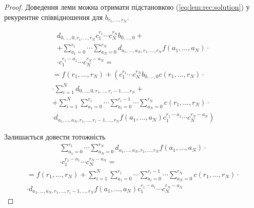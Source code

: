 \documentclass{KnuBulletin}
\begin{document}
\begin{multicols}{2}
\begin{proof}
    Доведення леми можна отримати підстановкою (\ref{eq:lem:rec:solution})  у рекурентне співвідношення для $b_{r_1,\dots,r_N}$.
        
        \begin{multline*}
        d_{0,\dots,0,r_1,\dots,r_N}
        c_1^{r_1}\cdots
        c_N^{r_N}
        b_{0,\dots,0}
        +\\+
        \sum_{a_1=0}^{r_1}
        \cdots
        \sum_{a_N=0}^{r_N}
        d_{a_1,\dots,a_N,r_1,\dots,r_N}
        f(a_1,\dots,a_N)
        \cdot\\\cdot
        c_1^{r_1-a_1}
        \cdots
        c_N^{r_N-a_N}
        =
        \end{multline*}
        \begin{multline*}
        =
        f(r_1,\dots,r_N) + 
        \left(
        c_1^{r_1}
        \cdots
        c_N^{r_N}
        b_{0,\dots,0}
        c(r_1,\dots,r_N) 
        \cdot\right.\\\left.\cdot
        \sum_{i=1}^{N}
        d_{0,\dots,0,r_1,\dots,r_i-1,\dots,r_N}
        +        
        \right.\\\left.
        +
        \sum_{i=1}^{N}
        \sum_{a_1=0}^{r_1}
        \cdots
        \sum_{a_i=0}^{r_i-1}
        \cdots
        \sum_{a_N=0}^{r_N}
        c(r_1,\dots,r_N) 
        \cdot\right.\\\left.\cdot
        d_{a_1,\dots,a_N,r_1,\dots,r_i-1,\dots,r_N}
        f(a_1,\dots,a_N)
        c_1^{r_1-a_1}
        \cdots
        c_N^{r_N-a_N}
        \right)
        \end{multline*}        
        
        Залишається довести тотожність
        \begin{multline*}
        \sum_{a_1=0}^{r_1}
        \cdots
        \sum_{a_N=0}^{r_N}
        d_{a_1,\dots,a_N,r_1,\dots,r_N}
        f(a_1,\dots,a_N)
        \cdot\\\cdot
        c_1^{r_1-a_1}
        \cdots
        c_N^{r_N-a_N}
        =
        \end{multline*}
        \begin{multline*}
        =
         f(r_1,\dots,r_N) 
        +
        \sum_{i=1}^{N}
        \sum_{a_1=0}^{r_1}
        \cdots
        \sum_{a_i=0}^{r_i-1}
        \cdots
        \sum_{a_N=0}^{r_N}
        c(r_1,\dots,r_N) 
        \cdot\\\cdot
        d_{a_1,\dots,a_N,r_1,\dots,r_i-1,\dots,r_N}
        f(a_1,\dots,a_N)
        c_1^{r_1-a_1}
        \cdots
        c_N^{r_N-a_N}
        \end{multline*}        
        

\end{proof}
\end{multicols}
\end{document}
